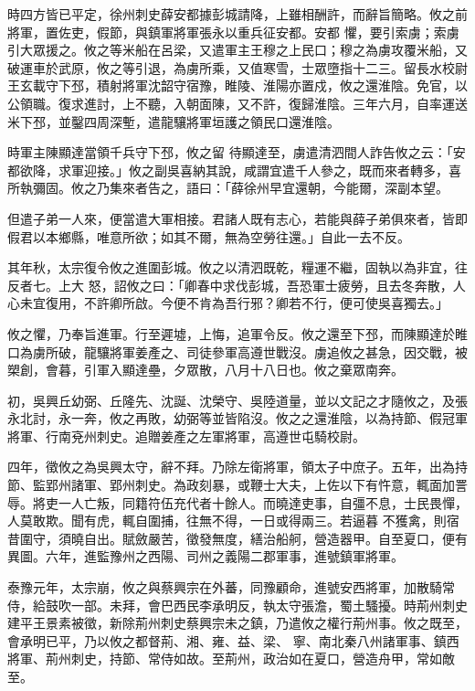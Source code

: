 \begin{pinyinscope}
 時四方皆已平定，徐州刺史薛安都據彭城請降，上雖相酬許，而辭旨簡略。攸之前將軍，置佐吏，假節，與鎮軍將軍張永以重兵征安都。安都
 懼，要引索虜；索虜引大眾援之。攸之等米船在呂梁，又遣軍主王穆之上民口；穆之為虜攻覆米船，又破運車於武原，攸之等引退，為虜所乘，又值寒雪，士眾墮指十二三。留長水校尉王玄載守下邳，積射將軍沈韶守宿豫，睢陵、淮陽亦置戍，攸之還淮陰。免官，以公領職。復求進討，上不聽，入朝面陳，又不許，復歸淮陰。三年六月，自率運送米下邳，並鑿四周深塹，遣龍驤將軍垣護之領民口還淮陰。



 時軍主陳顯達當領千兵守下邳，攸之留
 待顯達至，虜遣清泗間人詐告攸之云：「安都欲降，求軍迎接。」攸之副吳喜納其說，咸謂宜遣千人參之，既而來者轉多，喜所執彌固。攸之乃集來者告之，語曰：「薛徐州早宜還朝，今能爾，深副本望。



 但遣子弟一人來，便當遣大軍相接。君諸人既有志心，若能與薛子弟俱來者，皆即假君以本鄉縣，唯意所欲；如其不爾，無為空勞往還。」自此一去不反。



 其年秋，太宗復令攸之進圍彭城。攸之以清泗既乾，糧運不繼，固執以為非宜，往反者七。上大
 怒，詔攸之曰：「卿春中求伐彭城，吾恐軍士疲勞，且去冬奔散，人心未宜復用，不許卿所啟。今便不肯為吾行邪？卿若不行，便可使吳喜獨去。」



 攸之懼，乃奉旨進軍。行至遲墟，上悔，追軍令反。攸之還至下邳，而陳顯達於睢口為虜所破，龍驤將軍姜產之、司徒參軍高遵世戰沒。虜追攸之甚急，因交戰，被槊創，會暮，引軍入顯達壘，夕眾散，八月十八日也。攸之棄眾南奔。



 初，吳興丘幼弼、丘隆先、沈誕、沈榮守、吳陸道量，並以文記之才隨攸之，及張
 永北討，永一奔，攸之再敗，幼弼等並皆陷沒。攸之之還淮陰，以為持節、假冠軍將軍、行南兗州刺史。追贈姜產之左軍將軍，高遵世屯騎校尉。



 四年，徵攸之為吳興太守，辭不拜。乃除左衛將軍，領太子中庶子。五年，出為持節、監郢州諸軍、郢州刺史。為政刻暴，或鞭士大夫，上佐以下有忤意，輒面加詈辱。將吏一人亡叛，同籍符伍充代者十餘人。而曉達吏事，自彊不息，士民畏憚，人莫敢欺。聞有虎，輒自圍捕，往無不得，一日或得兩三。若逼暮
 不獲禽，則宿昔圍守，須曉自出。賦斂嚴苦，徵發無度，繕治船舸，營造器甲。自至夏口，便有異圖。六年，進監豫州之西陽、司州之義陽二郡軍事，進號鎮軍將軍。



 泰豫元年，太宗崩，攸之與蔡興宗在外蕃，同豫顧命，進號安西將軍，加散騎常侍，給鼓吹一部。未拜，會巴西民李承明反，執太守張澹，蜀土騷擾。時荊州刺史建平王景素被徵，新除荊州刺史蔡興宗未之鎮，乃遣攸之權行荊州事。攸之既至，會承明已平，乃以攸之都督荊、湘、雍、益、梁、
 寧、南北秦八州諸軍事、鎮西將軍、荊州刺史，持節、常侍如故。至荊州，政治如在夏口，營造舟甲，常如敵至。




\end{pinyinscope}
